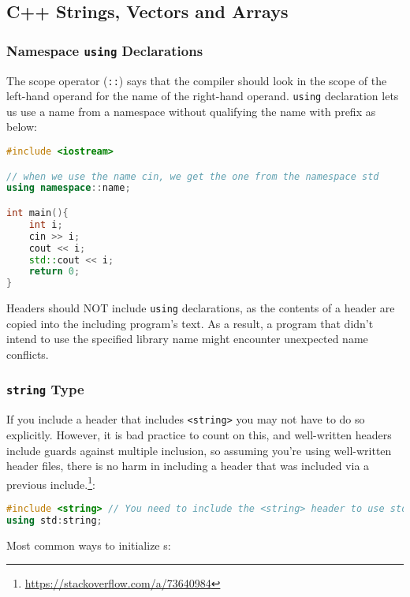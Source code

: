 \subsection{C++ Strings, Vectors and Arrays}
\label{task:20231201_cpp}

\subsubsection{Namespace \texttt{using} Declarations}

The scope operator (\texttt{::}) says that the compiler should look in the scope of the left-hand operand for the name of the right-hand operand. \texttt{using} declaration lets us use a name from a namespace without qualifying the name with  prefix as below:
\begin{lstlisting}[language=C++]
#include <iostream>

// when we use the name cin, we get the one from the namespace std
using namespace::name;

int main(){
    int i;
    cin >> i;
    cout << i;
    std::cout << i;
    return 0;
}
\end{lstlisting}

Headers should NOT include \texttt{using} declarations, as the contents of a header are copied into the including program's text. As a result, a program that didn't intend to use the specified library name might encounter unexpected name conflicts.

\subsubsection{\texttt{string} Type}

If you include a header that includes \texttt{<string>} you may not have to do so explicitly. However, it is bad practice to count on this, and well-written headers include guards against multiple inclusion, so assuming you're using well-written header files, there is no harm in including a header that was included via a previous include.\footnote{\url{https://stackoverflow.com/a/73640984}}:

\begin{lstlisting}[language=C++]
#include <string> // You need to include the <string> header to use std::string.
using std:string; 
\end{lstlisting}

Most common ways to initialize s:

